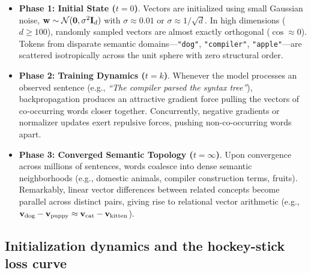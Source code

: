 \documentclass[../../main.tex]{subfiles}
\begin{document}
\begin{itemize}
    \item \textbf{Phase 1: Initial State ($t = 0$)}. Vectors are initialized using small Gaussian noise, $\mathbf{w} \sim \mathcal{N}(\mathbf{0}, \sigma^2 \mathbf{I}_d)$ with $\sigma \approx 0.01$ or $\sigma \approx 1/\sqrt{d}$. In high dimensions ($d \ge 100$), randomly sampled vectors are almost exactly orthogonal ($\cos \approx 0$). Tokens from disparate semantic domains---\texttt{"dog"}, \texttt{"compiler"}, \texttt{"apple"}---are scattered isotropically across the unit sphere with zero structural order.
    
    \item \textbf{Phase 2: Training Dynamics ($t = k$)}. Whenever the model processes an observed sentence (e.g., \emph{``The compiler parsed the syntax tree''}), backpropagation produces an attractive gradient force pulling the vectors of co-occurring words closer together. Concurrently, negative gradients or normalizer updates exert repulsive forces, pushing non-co-occurring words apart.
    
    \item \textbf{Phase 3: Converged Semantic Topology ($t = \infty$)}. Upon convergence across millions of sentences, words coalesce into dense semantic neighborhoods (e.g., domestic animals, compiler construction terms, fruits). Remarkably, linear vector differences between related concepts become parallel across distinct pairs, giving rise to relational vector arithmetic (e.g., $\mathbf{v}_{\text{dog}} - \mathbf{v}_{\text{puppy}} \approx \mathbf{v}_{\text{cat}} - \mathbf{v}_{\text{kitten}}$).
\end{itemize}

\subsection{Initialization dynamics and the hockey-stick loss curve}
\label{subsec:initialization_dynamics}
\end{document}
